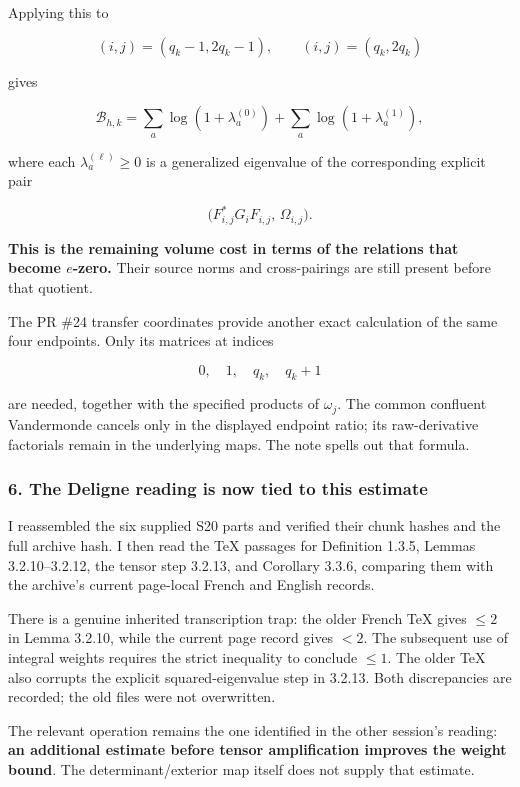 Applying this to

\[
(i,j)=(q_k-1,2q_k-1),
\qquad
(i,j)=(q_k,2q_k)
\]

gives

\[
\boxed{
\mathcal B_{h,k}
=
\sum_a\log(1+\lambda_a^{(0)})
+
\sum_a\log(1+\lambda_a^{(1)}),
}
\]

where each \(\lambda_a^{(\ell)}\ge0\) is a generalized eigenvalue of the corresponding explicit pair

\[
\bigl(F_{i,j}^*G_iF_{i,j},\,\Omega_{i,j}\bigr).
\]

\textbf{This is the remaining volume cost in terms of the relations that become \(e\)-zero.} Their source norms and cross-pairings are still present before that quotient.

The PR \#24 transfer coordinates provide another exact calculation of the same four endpoints. Only its matrices at indices

\[
0,\quad1,\quad q_k,\quad q_k+1
\]

are needed, together with the specified products of \(\omega_j\). The common confluent Vandermonde cancels only in the displayed endpoint ratio; its raw-derivative factorials remain in the underlying maps. The note spells out that formula.

\subsubsection{6. The Deligne reading is now tied to this estimate}\label{endpoint-user_norm_original--the-deligne-reading-is-now-tied-to-this-estimate}

I reassembled the six supplied S20 parts and verified their chunk hashes and the full archive hash. I then read the TeX passages for Definition 1.3.5, Lemmas 3.2.10--3.2.12, the tensor step 3.2.13, and Corollary 3.3.6, comparing them with the archive's current page-local French and English records.

There is a genuine inherited transcription trap: the older French TeX gives \(\le2\) in Lemma 3.2.10, while the current page record gives \textbf{\(<2\)}. The subsequent use of integral weights requires the strict inequality to conclude \(\le1\). The older TeX also corrupts the explicit squared-eigenvalue step in 3.2.13. Both discrepancies are recorded; the old files were not overwritten.

The relevant operation remains the one identified in the other session's reading: \textbf{an additional estimate before tensor amplification improves the weight bound}. The determinant/exterior map itself does not supply that estimate.

